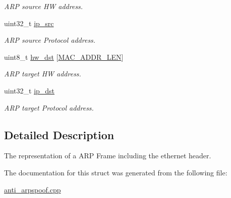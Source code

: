 \begin{DoxyCompactItemize}
\begin{DoxyCompactList}\small\item\em A\+RP source HW address. \end{DoxyCompactList}\item 
uint32\+\_\+t \hyperlink{structARPFrame_aef7ef7bd0a9949bfecb36bf45aeee351}{ip\+\_\+src}\hypertarget{structARPFrame_aef7ef7bd0a9949bfecb36bf45aeee351}{}\label{structARPFrame_aef7ef7bd0a9949bfecb36bf45aeee351}

\begin{DoxyCompactList}\small\item\em A\+RP source Protocol address. \end{DoxyCompactList}\item 
uint8\+\_\+t \hyperlink{structARPFrame_a3911c2e90910275b5275e6b7bbb934d0}{hw\+\_\+dst} \mbox{[}\hyperlink{anti__arpspoof_8cpp_a60cf9af36f952be0feb59d1f49d5edff}{M\+A\+C\+\_\+\+A\+D\+D\+R\+\_\+\+L\+EN}\mbox{]}\hypertarget{structARPFrame_a3911c2e90910275b5275e6b7bbb934d0}{}\label{structARPFrame_a3911c2e90910275b5275e6b7bbb934d0}

\begin{DoxyCompactList}\small\item\em A\+RP target HW address. \end{DoxyCompactList}\item 
uint32\+\_\+t \hyperlink{structARPFrame_a8e8bb98825012a34f65ada4e2dea9604}{ip\+\_\+dst}\hypertarget{structARPFrame_a8e8bb98825012a34f65ada4e2dea9604}{}\label{structARPFrame_a8e8bb98825012a34f65ada4e2dea9604}

\begin{DoxyCompactList}\small\item\em A\+RP target Protocol address. \end{DoxyCompactList}\end{DoxyCompactItemize}


\subsection{Detailed Description}
The representation of a A\+RP Frame including the ethernet header. 

The documentation for this struct was generated from the following file\+:\begin{DoxyCompactItemize}
\item 
\hyperlink{anti__arpspoof_8cpp}{anti\+\_\+arpspoof.\+cpp}\end{DoxyCompactItemize}
